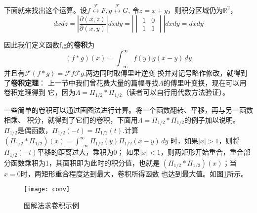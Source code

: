 \documentclass{ctexbook}
\begin{document}
下面就来找出这个运算。设$f\overset{\mathcal{F} }{\longleftrightarrow}F,g\overset{\mathcal{F} }{\longleftrightarrow}G$,
令$z=x+y$，则积分区域仍为$\mathbb{R}^2$，
\[dxdz=\left|\frac{\partial(x,z)}{\partial(x,y)}\right|dxdy=\left|\begin{vmatrix}
        1 & 0 \\
        1 & 1
    \end{vmatrix}\right| dxdy=dxdy\]

因此我们定义函数f,g的\textbf{卷积}为
\begin{equation}
    (f*g)(x)=\int_{-\infty}^{\infty}f(y)g(x-y)\,dy
\end{equation}
并且有$\mathcal{F} (f*g)=\mathcal{F} f\mathcal{F} g$.两边同时取傅里叶逆变
换并对记号略作修改，就得到了\textbf{卷积定理}：
\newpage 上一节中我们曾花费大量的篇幅寻找$\Lambda$的傅里叶变换，现在可以用卷积定理得到
它，因为$\Lambda=\Pi_{1/2}*\Pi_{1/2}$（读者可以自行用代数方法验证）。

一些简单的卷积可以通过画图法进行计算。将一个函数翻转、平移，再与另一函数相乘、
积分，就得到了它们的卷积，下面用$\Lambda=\Pi_{1/2}*\Pi_{1/2}$的例子加以说明。
$\Pi_{1/2}$是偶函数，$\Pi_{1/2}(-t)=\Pi_{1/2}(t)$.计算
$(\Pi_{1/2}*\Pi_{1/2})(x)=\int_{-\infty}^{\infty}\Pi_{1/2}(y)\Pi_{1/2}(x-y)\,dy$
时，如果$|x|>1$，则将$\Pi_{1/2}(-t)$平移的距离过大，乘积为0；
如果$|x|<1$，则两矩形开始重合，重合部分函数乘积为1，其面积即为此时的积分值，也就是
$(\Pi_{1/2}*\Pi_{1/2})(x)$；当$x=0$时，两矩形重合程度达到最大，卷积所得函数
也达到最大值。如图\ref{fig:conv}所示。
\begin{figure}
    \centering
    \texttt{[image: conv]}
    \caption{图解法求卷积示例}\label{fig:conv}
\end{figure}
\end{document}
